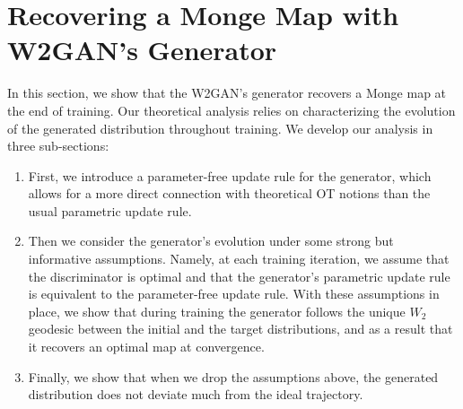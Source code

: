 \documentclass[runningheads]{llncs}
\begin{document}
\section{Recovering a Monge Map with W2GAN's Generator}
\label{sec:gen_recover_ot}
In this section, we show that the W2GAN's generator recovers a Monge map at the end of training. Our theoretical analysis relies on characterizing the evolution of the generated distribution throughout training. We develop our analysis in three sub-sections:
\begin{enumerate} %
    \item First, we introduce a parameter-free update rule for the generator, which allows for a more direct connection with theoretical OT notions than the usual parametric update rule. %
    \item Then we consider the generator's evolution under some strong but informative assumptions. Namely, at each training iteration, we assume that the discriminator is optimal and that the generator's parametric update rule is equivalent to the parameter-free update rule. With these assumptions in place, we show that during training the generator follows the unique $W_2$ geodesic between the initial and the target distributions, and as a result that it recovers an optimal map at convergence.
    \item Finally, we show that when we drop the assumptions above, the generated distribution does not deviate much from the ideal trajectory.
\end{enumerate}
\end{document}
